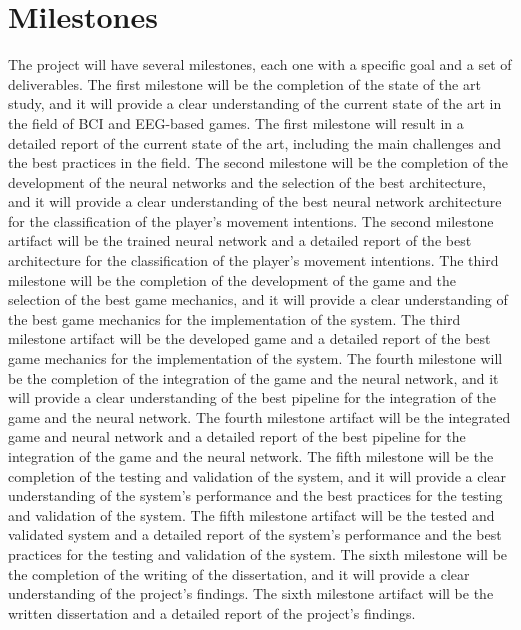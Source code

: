 \section{Milestones}
The project will have several milestones, each one with a specific goal and a set of deliverables.
The first milestone will be the completion of the state of the art study, and it will provide a clear understanding of the current state of the art in the field of BCI and EEG-based games.
The first milestone will result in a detailed report of the current state of the art, including the main challenges and the best practices in the field.
The second milestone will be the completion of the development of the neural networks and the selection of the best architecture, and it will provide a clear understanding of the best neural network architecture for the classification of the player's movement intentions.
The second milestone artifact will be the trained neural network and a detailed report of the best architecture for the classification of the player's movement intentions.
The third milestone will be the completion of the development of the game and the selection of the best game mechanics, and it will provide a clear understanding of the best game mechanics for the implementation of the system.
The third milestone artifact will be the developed game and a detailed report of the best game mechanics for the implementation of the system.
The fourth milestone will be the completion of the integration of the game and the neural network, and it will provide a clear understanding of the best pipeline for the integration of the game and the neural network.
The fourth milestone artifact will be the integrated game and neural network and a detailed report of the best pipeline for the integration of the game and the neural network.
The fifth milestone will be the completion of the testing and validation of the system, and it will provide a clear understanding of the system's performance and the best practices for the testing and validation of the system.
The fifth milestone artifact will be the tested and validated system and a detailed report of the system's performance and the best practices for the testing and validation of the system.
The sixth milestone will be the completion of the writing of the dissertation, and it will provide a clear understanding of the project's findings.
The sixth milestone artifact will be the written dissertation and a detailed report of the project's findings.

